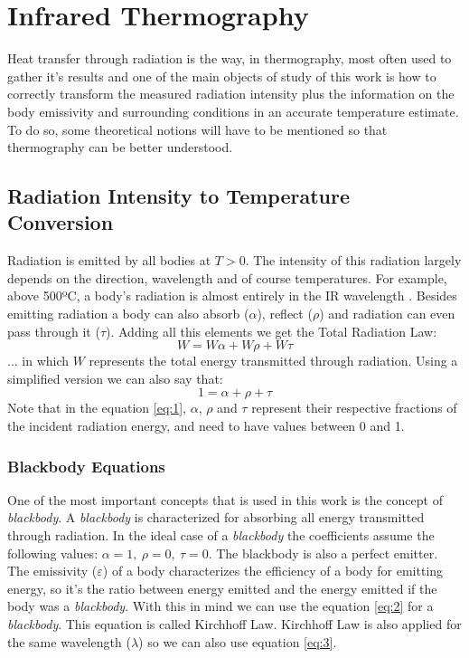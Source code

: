 \section{Infrared Thermography}
\label{sec:sectiona}

Heat transfer through radiation is the way, in thermography, most often used to gather it's results and one of the main objects of study of this work is how to correctly transform the measured radiation intensity plus the information on the body emissivity and surrounding conditions in an accurate temperature estimate. To do so, some theoretical notions will have to be mentioned so that thermography can be better understood.

\subsection{Radiation Intensity to Temperature Conversion}
\label{subsec:rad2tem}

Radiation is emitted by all bodies at $T>0$. The intensity of this radiation largely depends on the direction, wavelength and of course temperatures. For example, above 500ºC, a body's radiation is almost entirely in the IR wavelength \cite{IRCAM}. Besides emitting radiation a body can also absorb ($\alpha$), reflect ($\rho$) and radiation can even pass through it ($\tau$). Adding all this elements we get the Total Radiation Law:
\begin{equation}
    W = W\alpha + W\rho + W\tau
\end{equation}
... in which $W$ represents the total energy transmitted through radiation. Using a simplified version we can also say that:
\begin{equation}\label{eq:1}
	1 = \alpha + \rho + \tau
\end{equation}
Note that in the equation \ref{eq:1}, $\alpha$, $\rho$ and $\tau$ represent their respective fractions of the incident radiation energy, and need to have values between 0 and 1.\\

\subsubsection{Blackbody Equations}

\par One of the most important concepts that is used in this work is the concept of \textit{blackbody}. A \textit{blackbody} is characterized for absorbing all energy transmitted through radiation. In the ideal case of a \textit{blackbody} the coefficients assume the following values: $\alpha=1, \ \rho=0, \ \tau=0$. The blackbody is also a perfect emitter. The emissivity ($\varepsilon$) of a body characterizes the efficiency of a body for emitting energy, so it's the ratio between energy emitted and the energy emitted if the body was a \textit{blackbody}. With this in mind we can use the equation \ref{eq:2} for a \textit{blackbody}. This equation is called Kirchhoff Law. Kirchhoff Law is also applied for the same wavelength ($\lambda$) so we can also use equation \ref{eq:3}.

